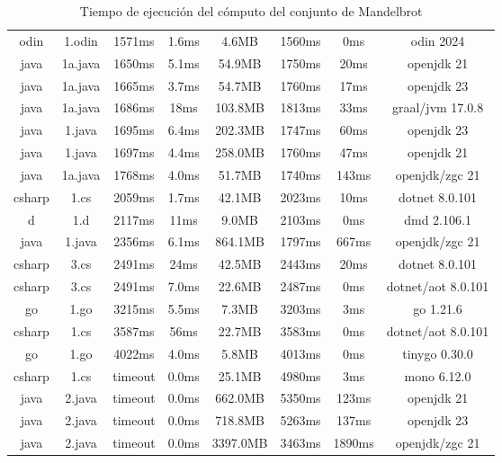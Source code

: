 \begin{table}[H]
{\begin{tabular}{|c c c c c c c c|}
            odin    & 1.odin  & 1571ms  & 1.6ms  & 4.6MB    & 1560ms     & 0ms       & odin 2024 \\
            java    & 1a.java & 1650ms  & 5.1ms  & 54.9MB   & 1750ms     & 20ms      & openjdk 21 \\
            java    & 1a.java & 1665ms  & 3.7ms  & 54.7MB   & 1760ms     & 17ms      & openjdk 23 \\
            java    & 1a.java & 1686ms  & 18ms 	 & 103.8MB  & 1813ms     & 33ms      & graal/jvm 17.0.8 \\
            java    & 1.java  & 1695ms  & 6.4ms  & 202.3MB  & 1747ms     & 60ms      & openjdk 23 \\
            java    & 1.java  & 1697ms  & 4.4ms  & 258.0MB  & 1760ms     & 47ms      & openjdk 21 \\
            java    & 1a.java & 1768ms  & 4.0ms  & 51.7MB   & 1740ms     & 143ms     & openjdk/zgc 21 \\
            csharp  & 1.cs    & 2059ms  & 1.7ms  & 42.1MB   & 2023ms     & 10ms      & dotnet 8.0.101 \\
            d       & 1.d     & 2117ms  & 11ms 	 & 9.0MB    & 2103ms     & 0ms       & dmd 2.106.1 \\
            java    & 1.java  & 2356ms  & 6.1ms  & 864.1MB  & 1797ms     & 667ms     & openjdk/zgc 21 \\
            csharp  & 3.cs    & 2491ms  & 24ms 	 & 42.5MB   & 2443ms     & 20ms      & dotnet 8.0.101 \\
            csharp  & 3.cs    & 2491ms  & 7.0ms  & 22.6MB   & 2487ms     & 0ms       & dotnet/aot 8.0.101 \\
            go      & 1.go    & 3215ms  & 5.5ms  & 7.3MB    & 3203ms     & 3ms       & go 1.21.6 \\
            csharp  & 1.cs    & 3587ms  & 56ms 	 & 22.7MB   & 3583ms     & 0ms       & dotnet/aot 8.0.101 \\
            go      & 1.go    & 4022ms  & 4.0ms  & 5.8MB    & 4013ms     & 0ms       & tinygo 0.30.0 \\
            csharp  & 1.cs    & timeout & 0.0ms  & 25.1MB   & 4980ms     & 3ms       & mono 6.12.0 \\
            java    & 2.java  & timeout & 0.0ms  & 662.0MB  & 5350ms     & 123ms     & openjdk 21 \\
            java    & 2.java  & timeout & 0.0ms  & 718.8MB  & 5263ms     & 137ms     & openjdk 23 \\
            java    & 2.java  & timeout & 0.0ms  & 3397.0MB & 3463ms     & 1890ms    & openjdk/zgc 21  \\
            \hline
        \end{tabular}
    }
    \caption{Tiempo de ejecución del cómputo del conjunto de Mandelbrot \cite{languagebench}}
    \label{table:languagebench}
\end{table}

